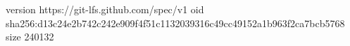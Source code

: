 version https://git-lfs.github.com/spec/v1
oid sha256:d13c24e2b742c242e909f4f51c1132039316c49cc49152a1b963f2ca7bcb5768
size 240132
